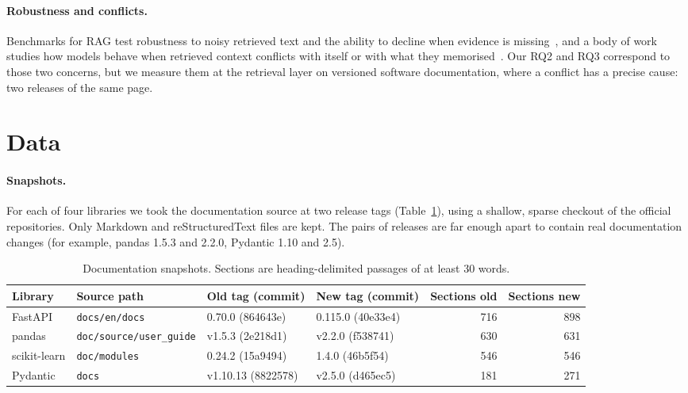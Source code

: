 \documentclass[11pt,a4paper]{article}
\begin{document}
\paragraph{Robustness and conflicts.}
Benchmarks for RAG test robustness to noisy retrieved text and the ability to decline when evidence is missing~\cite{chen2024rgb}, and a
body of work studies how models behave when retrieved context conflicts with itself or with what they memorised~\cite{xu2024conflicts}.
Our RQ2 and RQ3 correspond to those two concerns, but we measure them at the retrieval layer on versioned software documentation,
where a conflict has a precise cause: two releases of the same page.

\section{Data}
\label{sec:data}
\paragraph{Snapshots.}
For each of four libraries we took the documentation source at two release tags (Table~\ref{tab:data}), using a shallow, sparse
checkout of the official repositories. Only Markdown and reStructuredText files are kept. The pairs of releases are far enough apart
to contain real documentation changes (for example, pandas 1.5.3 and 2.2.0, Pydantic 1.10 and 2.5).

\begin{table}[htbp]\centering\footnotesize
\caption{Documentation snapshots. Sections are heading-delimited passages of at least 30 words.}\label{tab:data}
\setlength{\tabcolsep}{4pt}\scriptsize
\begin{tabular}{llllrr}
\toprule
Library & Source path & Old tag (commit) & New tag (commit) & Sections old & Sections new \\
\midrule
FastAPI & \texttt{docs/en/docs} & 0.70.0 (864643e) & 0.115.0 (40e33e4) & 716 & 898 \\
pandas & \texttt{doc/source/user\_guide} & v1.5.3 (2e218d1) & v2.2.0 (f538741) & 630 & 631 \\
scikit-learn & \texttt{doc/modules} & 0.24.2 (15a9494) & 1.4.0 (46b5f54) & 546 & 546 \\
Pydantic & \texttt{docs} & v1.10.13 (8822578) & v2.5.0 (d465ec5) & 181 & 271 \\
\bottomrule
\end{tabular}
\end{table}
\end{document}
